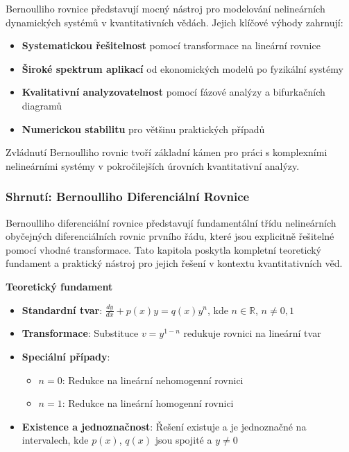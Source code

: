 \vspace{0.8\baselineskip}

\begin{conclusion}
\label{con:bernoulli-kvantitativni-praxe}
Bernoulliho rovnice představují mocný nástroj pro modelování nelineárních dynamických systémů v kvantitativních vědách. Jejich klíčové výhody zahrnují:

\begin{itemize}
\item \textbf{Systematickou řešitelnost} pomocí transformace na lineární rovnice
\item \textbf{Široké spektrum aplikací} od ekonomických modelů po fyzikální systémy
\item \textbf{Kvalitativní analyzovatelnost} pomocí fázové analýzy a bifurkačních diagramů
\item \textbf{Numerickou stabilitu} pro většinu praktických případů
\end{itemize}

Zvládnutí Bernoulliho rovnic tvoří základní kámen pro práci s komplexními nelineárními systémy v pokročilejších úrovních kvantitativní analýzy.
\end{conclusion}

\vspace{0.8\baselineskip}

\subsubsection{Shrnutí: Bernoulliho Diferenciální Rovnice}
\label{subsec:shrnutí-bernoulliho}

Bernoulliho diferenciální rovnice představují fundamentální třídu nelineárních obyčejných diferenciálních rovnic prvního řádu, které jsou explicitně řešitelné pomocí vhodné transformace. Tato kapitola poskytla kompletní teoretický fundament a praktický nástroj pro jejich řešení v kontextu kvantitativních věd.

\vspace{1\baselineskip}

\noindent\textbf{Teoretický fundament}

\begin{itemize}
\item \textbf{Standardní tvar}: $\frac{dy}{dx} + p(x)y = q(x)y^n$, kde $n \in \mathbb{R}$, $n \neq 0, 1$
\item \textbf{Transformace}: Substituce $v = y^{1-n}$ redukuje rovnici na lineární tvar
\item \textbf{Speciální případy}: 
  \begin{itemize}
  \item $n = 0$: Redukce na lineární nehomogenní rovnici
  \item $n = 1$: Redukce na lineární homogenní rovnici
  \end{itemize}
\item \textbf{Existence a jednoznačnost}: Řešení existuje a je jednoznačné na intervalech, kde $p(x)$, $q(x)$ jsou spojité a $y \neq 0$
\end{itemize}


